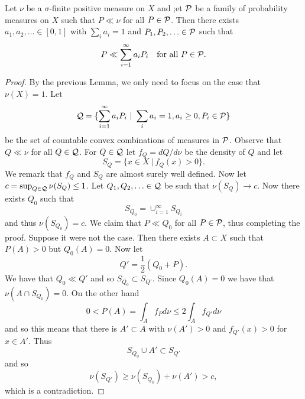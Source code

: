 \documentclass[twoside, a4paper, 10pt]{amsart}
\begin{document}
\begin{lemma} \label{lemma: countable sum dominates} Let $\nu$ be a $\sigma$-finite positive measure on $X$ and ;et $\mathcal{P}$ be a family of probability measures on $X$ such that $P \ll \nu$ for all $P \in \mathcal{P}$. Then there exists $a_1,a_2,\ldots \in [0,1]$ with $\sum_{i} a_i = 1$ and $P_1,P_2, \ldots \in \mathcal{P}$ such that $$P \ll \sum_{i=1}^{\infty} a_i P_i \quad \text{for all } P \in \mathcal{P}.$$

\end{lemma}

\begin{proof} By the previous Lemma, we only need to focus on the case that $\nu(X)=1$.  Let $$\mathcal{Q} = \{ \sum_{i=1}^{\infty} a_i P_i ~|~ \sum_{i} a_i = 1, a_i \geq 0, P_i \in \mathcal{P} \}$$ be the set of countable convex combinations of measures in $\mathcal{P}$. Observe that $Q \ll \nu$ for all $Q \in \mathcal{Q}$. For $Q \in \mathcal{Q}$ let $f_Q = dQ/d\nu$ be the density of $Q$ and let $$S_Q = \{ x \in X ~|~ f_Q(x)>0 \}.$$ We remark that $f_Q$ and $S_Q$ are almost surely well defined. Now let $c = \sup_{Q \in \mathcal{Q}} \nu(S_Q) \leq 1$. Let $Q_1,Q_2,\ldots \in \mathcal{Q}$ be such that $\nu(S_Q) \to c$. Now there exists $Q_0$ such that $$S_{Q_0} = \cup_{i=1}^{\infty} S_{Q_i}$$ and thus $\nu(S_{Q_0}) = c$. We claim that $P \ll Q_0$ for all $P \in \mathcal{P}$, thus completing the proof. Suppose it were not the case. Then there exists $A \subset X$ such that $P(A) >0$ but $Q_0(A)=0$. Now let $$Q' = \frac{1}{2}\left( Q_0 + P \right).$$ We have that $Q_0 \ll Q'$ and so $S_{Q_0} \subset S_{Q'}$. Since $Q_0(A)=0$ we have that $\nu(A \cap S_{Q_0}) = 0$. On the other hand $$0<P(A) = \int_{A} f_P d\nu \leq 2\int_A f_{Q'} d\nu$$ and so this means that there is $A' \subset A$ with $\nu(A')>0$ and $f_{Q'}(x) >0$ for $x \in A'$. Thus $$S_{Q_0} \cup A' \subset S_{Q'}$$ and so $$\nu(S_{Q'}) \geq \nu(S_{Q_0}) + \nu(A') > c,$$ which is a contradiction. \end{proof}
\end{document}
